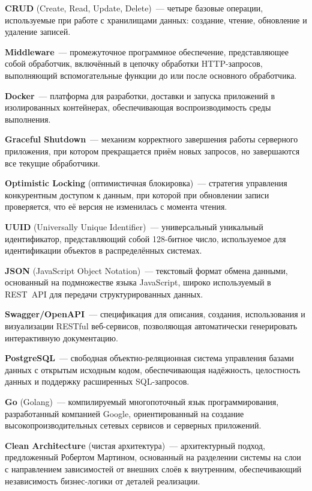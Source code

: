 \documentclass[a4paper,14pt]{extarticle}
\begin{document}
\textbf{CRUD} (Create, Read, Update, Delete)~--- четыре базовые операции, используемые при работе с хранилищами данных: создание, чтение, обновление и удаление записей.

\textbf{Middleware}~--- промежуточное программное обеспечение, представляющее собой обработчик, включённый в цепочку обработки HTTP-запросов, выполняющий вспомогательные функции до или после основного обработчика.

\textbf{Docker}~--- платформа для разработки, доставки и запуска приложений в изолированных контейнерах, обеспечивающая воспроизводимость среды выполнения.

\textbf{Graceful Shutdown}~--- механизм корректного завершения работы серверного приложения, при котором прекращается приём новых запросов, но завершаются все текущие обработчики.

\textbf{Optimistic Locking} (оптимистичная блокировка)~--- стратегия управления конкурентным доступом к данным, при которой при обновлении записи проверяется, что её версия не изменилась с момента чтения.

\textbf{UUID} (Universally Unique Identifier)~--- универсальный уникальный идентификатор, представляющий собой 128-битное число, используемое для идентификации объектов в распределённых системах.

\textbf{JSON} (JavaScript Object Notation)~--- текстовый формат обмена данными, основанный на подмножестве языка JavaScript, широко используемый в REST~API для передачи структурированных данных.

\textbf{Swagger/OpenAPI}~--- спецификация для описания, создания, использования и визуализации RESTful веб-сервисов, позволяющая автоматически генерировать интерактивную документацию.

\textbf{PostgreSQL}~--- свободная объектно-реляционная система управления базами данных с открытым исходным кодом, обеспечивающая надёжность, целостность данных и поддержку расширенных SQL-запросов.

\textbf{Go} (Golang)~--- компилируемый многопоточный язык программирования, разработанный компанией Google, ориентированный на создание высокопроизводительных сетевых сервисов и серверных приложений.

\textbf{Clean Architecture} (чистая архитектура)~--- архитектурный подход, предложенный Робертом Мартином, основанный на разделении системы на слои с направлением зависимостей от внешних слоёв к внутренним, обеспечивающий независимость бизнес-логики от деталей реализации.
\end{document}
